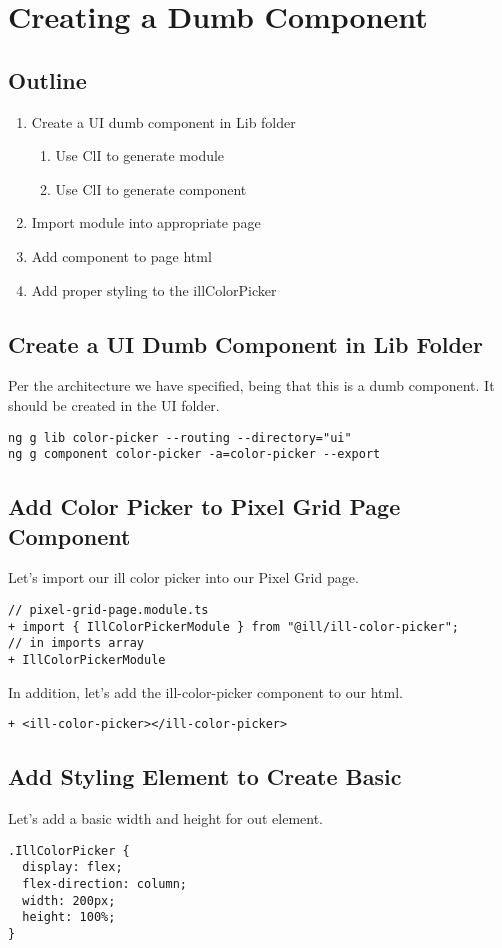 \maketitle{}
\section{ Creating a Dumb Component }

\subsection {Outline}

\begin{enumerate}
  \item Create a UI dumb component in Lib folder
    \begin{enumerate}
      \item Use ClI to generate module
      \item Use ClI to generate component
    \end{enumerate}
  \item Import module into appropriate page
  \item Add component to page html
  \item Add proper styling to the illColorPicker
\end{enumerate}

\subsection {Create a UI Dumb Component in Lib Folder}
Per the architecture we have specified, being that this is a dumb component. It
should be created in the UI folder.

\begin{lstlisting}
ng g lib color-picker --routing --directory="ui"
ng g component color-picker -a=color-picker --export
\end{lstlisting}

\subsection{ Add Color Picker to Pixel Grid Page Component }
Let's import our ill color picker into our Pixel Grid page.

\begin{lstlisting}
// pixel-grid-page.module.ts
+ import { IllColorPickerModule } from "@ill/ill-color-picker";
// in imports array
+ IllColorPickerModule
\end{lstlisting}

In addition, let's add the ill-color-picker component to our html.
\begin{lstlisting}
+ <ill-color-picker></ill-color-picker>
\end{lstlisting}

\subsection{ Add Styling Element to Create Basic  }
Let's add a basic width and height for out element.
\begin{lstlisting}
.IllColorPicker {
  display: flex;
  flex-direction: column;
  width: 200px;
  height: 100%;
}
\end{lstlisting}

